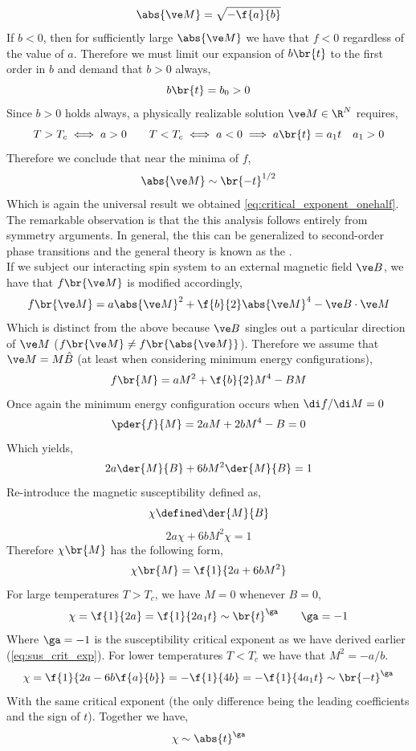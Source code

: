 \documentclass{article}
\begin{document}
\[ \abs{\ve M} = \sqrt{-\f{a}{b}} \]
If $b < 0$, then for sufficiently large $\abs{\ve M}$ we have that $f < 0$ regardless of the value of $a$. Therefore we must limit our expansion of $b\br{t}$ to the first order in $b$ and demand that $b > 0$ always,
\[ b \br{t} = b_0 > 0 \]
Since $b > 0$ holds always, a physically realizable solution $\ve M \in \R^{N}$ requires,
\[ T>T_c \iff a > 0 \qquad T < T_c \iff a < 0 \implies a\br{t} = a_1 t \quad a_1 > 0 \]
Therefore we conclude that near the minima of $f$,
\[ \abs{\ve M} \sim \br{-t}^{1/2} \]
Which is again the universal result we obtained \cref{eq:critical_exponent_onehalf}. The remarkable observation is that the this analysis follows entirely from symmetry arguments. In general, the this can be generalized to second-order phase transitions and the general theory is known as the .\\

If we subject our interacting spin system to an external magnetic field $\ve B$, we have that $f\br{\ve M}$ is modified accordingly,
\[ f\br{\ve M} = a \abs{\ve M}^2 + \f{b}{2}\abs{\ve M}^4 - \ve B \cdot \ve M \]
Which is distinct from the above because $\ve B$ singles out a particular direction of $\ve M$ ($f\br{\ve M} \neq f \br{\abs{\ve M}}$). Therefore we assume that $\ve M = M \hat B$ (at least when considering minimum energy configurations),
\[ f\br{M} = a M^2 + \f{b}{2} M^4 - BM \]
Once again the minimum energy configuration occurs when $\di f / \di M = 0$
\[ \pder{f}{M} = 2 a M + 2 b M^4 - B = 0 \]
Which yields,
\[ 2 a\der{M}{B} + 6 b M^2 \der{M}{B} = 1 \]
Re-introduce the magnetic susceptibility defined as,
\[ \chi \defined \der{M}{B} \]
\[ 2 a \chi + 6 b M^2 \chi = 1 \]
Therefore $\chi\br{M}$ has the following form,
\[ \chi\br{M} = \f{1}{2 a + 6 b M^2} \]
For large temperatures $T > T_c$, we have $M = 0$ whenever $B=0$,
\[ \chi = \f{1}{2a} = \f{1}{2a_1t} \sim \br{t}^{\ga}\qquad \ga= -1 \]
Where $\ga = -1$ is the susceptibility critical exponent as we have derived earlier (\cref{eq:sus_crit_exp}). For lower temperatures $T < T_c$ we have that $M^2 = - a / b$.
\[ \chi = \f{1}{2 a - 6 b\f{a}{b}} = - \f{1}{4b} = - \f{1}{4 a_1 t} \sim \br{-t}^{\ga} \]
With the same critical exponent (the only difference being the leading coefficients and the sign of $t$). Together we have,
\[ \chi \sim \abs{t}^{\ga} \]

\begin{center}
\end{center}
\end{document}

